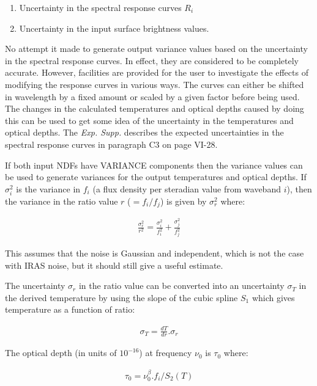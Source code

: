 \begin{enumerate}
\item Uncertainty in the spectral response curves $R_{i}$
\item Uncertainty in the input surface brightness values.
\end{enumerate}

No attempt it made to generate output variance values based on the uncertainty
in the spectral response curves. In effect, they are considered to be completely
accurate. However, facilities are provided for the user to investigate the
effects of modifying the response curves in various ways. The curves can either
be shifted in wavelength by a fixed amount or scaled by a given factor before
being used. The changes in the calculated temperatures and optical depths caused
by doing this can be used to get some idea of the uncertainty in the
temperatures and optical depths. The {\em Exp. Supp.} describes the expected
uncertainties in the spectral response curves in paragraph C3 on page VI-28.

If both input {\small NDF}s have {\small VARIANCE} components then the variance
values can be used to generate variances for the output temperatures and optical
depths. If $\sigma^{2}_{i}$ is the variance in $f_{i}$ (a flux density per
steradian value from waveband $i$), then the variance in the ratio value $r$
($=f_{i}/f_{j}$) is given by $\sigma^{2}_{r}$ where:

\begin{eqnarray*}
\frac{\sigma^{2}_{r}}{r^{2}} = \frac{\sigma^{2}_{i}}{f_{i}^{2}} + \frac{\sigma^{2}_{j}}{f_{j}^{2}}
\end{eqnarray*}

This assumes that the noise is Gaussian and independent, which is not the case
with {\small IRAS} noise, but it should still give a useful estimate.

The uncertainty $\sigma_{r}$ in the ratio value can be converted into an
uncertainty $\sigma_{T}$ in the derived temperature by using the slope of the
cubic spline $S_{1}$ which gives temperature as a function of ratio:

\begin{eqnarray*}
\sigma_{T} = \frac{dT}{dr}.\sigma_{r}
\end{eqnarray*}

The optical depth (in units of $10^{-16}$) at frequency $\nu_{0}$ is $\tau_{0}$
where:

\begin{eqnarray*}
\tau_{0} = \nu_{0}^{\beta}.f_{i}/S_{2}( T )
\end{eqnarray*}

